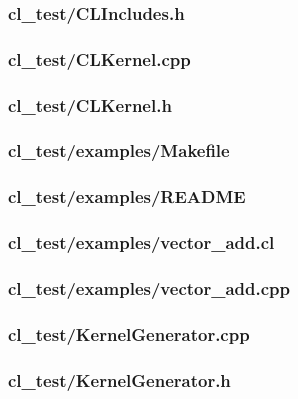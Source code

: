 \documentclass{article}
\begin{document}
\subsubsection*{cl\_test/CLIncludes.h}


\subsubsection*{cl\_test/CLKernel.cpp}


\subsubsection*{cl\_test/CLKernel.h}


\subsubsection*{cl\_test/examples/Makefile}


\subsubsection*{cl\_test/examples/README}


\subsubsection*{cl\_test/examples/vector\_add.cl}


\subsubsection*{cl\_test/examples/vector\_add.cpp}


\subsubsection*{cl\_test/KernelGenerator.cpp}


\subsubsection*{cl\_test/KernelGenerator.h}

\end{document}
